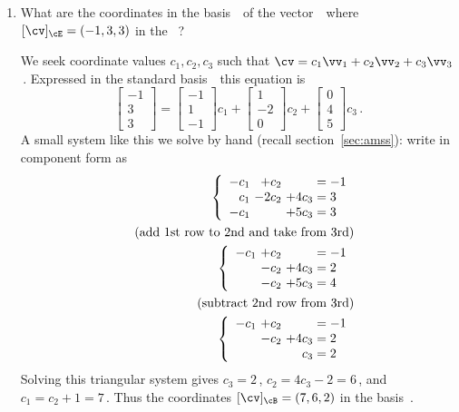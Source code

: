 \begin{example}
\begin{enumerate}
\item What are the coordinates in the basis~\cB\ of the vector~\cv\ where \([\cv]_\cE=(-1,3,3)\) in the ~\cE?
\begin{solution} 
We seek coordinate values \(c_1,c_2,c_3\) such that \(\cv=c_1\vv_1+c_2\vv_2+c_3\vv_3\)\,. 
Expressed in the standard basis~\cE\ this equation is
\begin{equation*}
\begin{bmatrix} -1\\3\\3 \end{bmatrix}=
\begin{bmatrix} -1\\1\\-1 \end{bmatrix}c_1+
\begin{bmatrix} 1\\-2\\0 \end{bmatrix}c_2+
\begin{bmatrix} 0\\4\\5 \end{bmatrix}c_3\,.
\end{equation*}
A small system like this we solve by hand (recall section~\ref{sec:amss}): write in component form as
\begin{eqnarray*}
&&\left\{\begin{array}{r@{\ }r@{\ }r@{{}={}}l}  
-c_1&+c_2&&-1 \\
c_1&-2c_2&+4c_3&3 \\
-c_1&&+5c_3&3
\end{array}\right.
\\&&(\text{add 1st row to 2nd and take from 3rd})
\\&&\left\{\begin{array}{r@{\ }r@{\ }r@{{}={}}l}  
-c_1&+c_2&&-1 \\
&-c_2&+4c_3&2 \\
&-c_2&+5c_3&4
\end{array}\right.
\\&&(\text{subtract 2nd row from 3rd})
\\&&\left\{\begin{array}{r@{\ }r@{\ }r@{{}={}}l}  
-c_1&+c_2&&-1 \\
&-c_2&+4c_3&2 \\
&&c_3&2
\end{array}\right.
\end{eqnarray*}
Solving this triangular system gives \(c_3=2\)\,, \(c_2=4c_3-2=6\)\,, and \(c_1=c_2+1=7\)\,.
Thus the coordinates \([\cv]_\cB=(7,6,2)\) in the basis~\cB.
\end{solution}



\end{enumerate}
\end{example}
